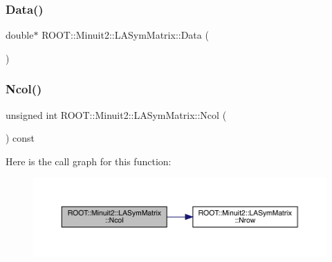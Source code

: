 \subsubsection{\texorpdfstring{Data()}{Data()}\hspace{0.1cm}{\footnotesize\ttfamily [6/6]}}
{\footnotesize\ttfamily double$\ast$ R\+O\+O\+T\+::\+Minuit2\+::\+L\+A\+Sym\+Matrix\+::\+Data (\begin{DoxyParamCaption}{ }\end{DoxyParamCaption})\hspace{0.3cm}{\ttfamily [inline]}}

\mbox{\label{classROOT_1_1Minuit2_1_1LASymMatrix_a36bb0f349110a80cb742953ae68fc9c5}} 
\subsubsection{\texorpdfstring{Ncol()}{Ncol()}\hspace{0.1cm}{\footnotesize\ttfamily [1/3]}}
{\footnotesize\ttfamily unsigned int R\+O\+O\+T\+::\+Minuit2\+::\+L\+A\+Sym\+Matrix\+::\+Ncol (\begin{DoxyParamCaption}{ }\end{DoxyParamCaption}) const\hspace{0.3cm}{\ttfamily [inline]}}

Here is the call graph for this function\+:
\nopagebreak
\begin{figure}[H]
\begin{center}
\leavevmode
\includegraphics[width=350pt]{d3/d72/classROOT_1_1Minuit2_1_1LASymMatrix_a36bb0f349110a80cb742953ae68fc9c5_cgraph}
\end{center}
\end{figure}
\mbox{\label{classROOT_1_1Minuit2_1_1LASymMatrix_a36bb0f349110a80cb742953ae68fc9c5}} 
